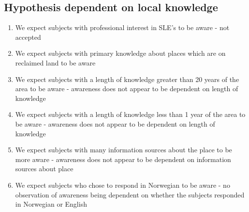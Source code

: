 \paragraph{}

\subsection{Hypothesis dependent on local knowledge}
\begin{enumerate}
    \item We expect subjects with professional interest in SLE's to be aware - not accepted
    \item We expect subjects with primary knowledge about places which are on reclaimed land to be aware
    \item We expect subjects with a length of knowledge greater than 20 years of the area to be aware -  awareness does not appear to be dependent on length of knowledge
    \item We expect subjects with a length of knowledge less than 1 year of the area to be aware -   awareness does not appear to be dependent on length of knowledge
    \item We expect subjects with many information sources about the place to be more aware - awareness does not appear to be dependent on information sources about place
    \item We expect subjects who chose to respond in Norwegian to be aware - no observation of awareness being dependent on whether the subjects responded in Norwegian or English
\end{enumerate}
\paragraph{}

